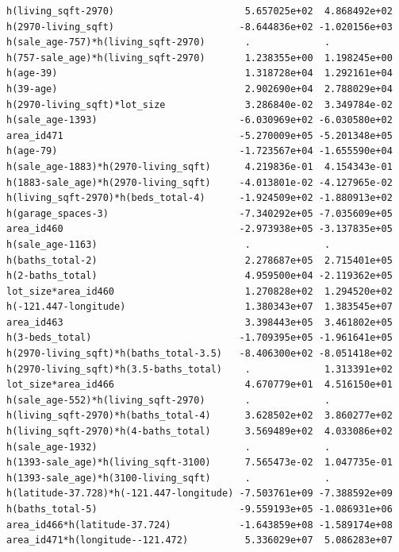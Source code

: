 \documentclass[
]{article}
\begin{document}
\begin{verbatim}
h(living_sqft-2970)                       5.657025e+02  4.868492e+02
h(2970-living_sqft)                      -8.644836e+02 -1.020156e+03
h(sale_age-757)*h(living_sqft-2970)       .             .           
h(757-sale_age)*h(living_sqft-2970)       1.238355e+00  1.198245e+00
h(age-39)                                 1.318728e+04  1.292161e+04
h(39-age)                                 2.902690e+04  2.788029e+04
h(2970-living_sqft)*lot_size              3.286840e-02  3.349784e-02
h(sale_age-1393)                         -6.030969e+02 -6.030580e+02
area_id471                               -5.270009e+05 -5.201348e+05
h(age-79)                                -1.723567e+04 -1.655590e+04
h(sale_age-1883)*h(2970-living_sqft)      4.219836e-01  4.154343e-01
h(1883-sale_age)*h(2970-living_sqft)     -4.013801e-02 -4.127965e-02
h(living_sqft-2970)*h(beds_total-4)      -1.924509e+02 -1.880913e+02
h(garage_spaces-3)                       -7.340292e+05 -7.035609e+05
area_id460                               -2.973938e+05 -3.137835e+05
h(sale_age-1163)                          .             .           
h(baths_total-2)                          2.278687e+05  2.715401e+05
h(2-baths_total)                          4.959500e+04 -2.119362e+05
lot_size*area_id460                       1.270828e+02  1.294520e+02
h(-121.447-longitude)                     1.380343e+07  1.383545e+07
area_id463                                3.398443e+05  3.461802e+05
h(3-beds_total)                          -1.709395e+05 -1.961641e+05
h(2970-living_sqft)*h(baths_total-3.5)   -8.406300e+02 -8.051418e+02
h(2970-living_sqft)*h(3.5-baths_total)    .             1.313391e+02
lot_size*area_id466                       4.670779e+01  4.516150e+01
h(sale_age-552)*h(living_sqft-2970)       .             .           
h(living_sqft-2970)*h(baths_total-4)      3.628502e+02  3.860277e+02
h(living_sqft-2970)*h(4-baths_total)      3.569489e+02  4.033086e+02
h(sale_age-1932)                          .             .           
h(1393-sale_age)*h(living_sqft-3100)      7.565473e-02  1.047735e-01
h(1393-sale_age)*h(3100-living_sqft)      .             .           
h(latitude-37.728)*h(-121.447-longitude) -7.503761e+09 -7.388592e+09
h(baths_total-5)                         -9.559193e+05 -1.086931e+06
area_id466*h(latitude-37.724)            -1.643859e+08 -1.589174e+08
area_id471*h(longitude--121.472)          5.336029e+07  5.086283e+07
                                                                    

\end{verbatim}
\end{document}
